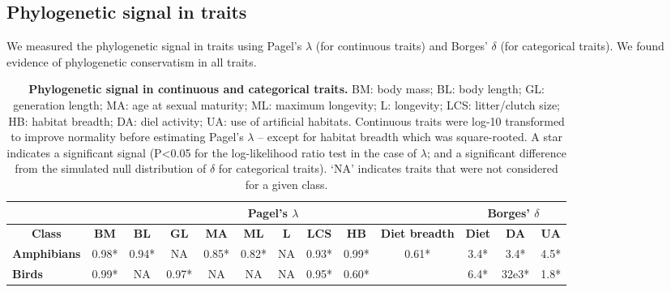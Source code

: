 \documentclass[11pt]{article}
\renewcommand{\baselinestretch}{1}
\begin{document}
\subsection{Phylogenetic signal in traits}
We measured the phylogenetic signal in traits using Pagel's $\lambda$ (for continuous traits) and Borges' $\delta$ (for categorical traits). We found evidence of phylogenetic conservatism in all traits.

\begin{table}[h!]
\renewcommand{\baselinestretch}{1}
\renewcommand{\arraystretch}{1.2}
\begin{center}\fontsize{9}{11}\selectfont
\caption[Phylogenetic signal in continuous and categorical traits]{\textbf{Phylogenetic signal in continuous and categorical traits.} BM: body mass; BL: body length; GL: generation length; MA: age at sexual maturity; ML: maximum longevity; L: longevity; LCS: litter/clutch size; HB: habitat breadth; DA: diel activity; UA: use of artificial habitats. Continuous traits were log-10 transformed to improve normality before estimating Pagel’s $\lambda$ – except for habitat breadth which was square-rooted. A star indicates a significant signal (P<0.05 for the log-likelihood ratio test in the case of $\lambda$; and a significant difference from the simulated null distribution of $\delta$ for categorical traits). ‘NA’ indicates traits that were not considered for a given class. %
}
\label{SI_4_Table1}  
\begin{tabular}{l|c|c|c|c|c|c|c|c|c|c|c|c|}
\cline{2-13}
                                          & \multicolumn{9}{c|}{\textbf{Pagel's $\lambda$}}                                                                       & \multicolumn{3}{c|}{\textbf{Borges' $\delta$}} \\ \hline
\multicolumn{1}{|c|}{\textbf{Class}}      & \textbf{BM} & \textbf{BL} & \textbf{GL} & \textbf{MA} & \textbf{ML} & \textbf{L} & \textbf{LCS} & \textbf{HB} & \textbf{Diet breadth} & \textbf{Diet} &  \textbf{DA} & \textbf{UA} \\ \hline
\multicolumn{1}{|l|}{\textbf{Amphibians}} & 0.98*       & 0.94*       & NA          & 0.85*       & 0.82*       & NA         & 0.93*        & 0.99*    & 0.61*  & 3.4*         &  3.4*        & 4.5*        \\ %
\multicolumn{1}{|l|}{\textbf{Birds}}      & 0.99*       & NA          & 0.97*       & NA          & NA          & NA         & 0.95*        & 0.60*   &     & 6.4*         & 32e3*     & 1.8*        \\ %

\end{tabular}
\end{center}
\end{table}
\end{document}
